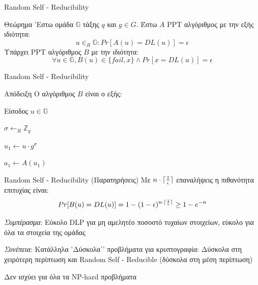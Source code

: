 \documentclass[handout]{beamer}
\DeclarePairedDelimiter{\ceil}{\lceil}{\rceil}
\begin{document}
 

\begin{frame}{Random Self - Reducibility}
	\begin{block}{Θεώρημα}
		'Εστω ομάδα $\mathbb{G}$ τάξης $q$ και $g \in G$. Έστω $A$ PPT αλγόριθμος με την εξής ιδιότητα:
		$$u \in_R \mathbb{G} : Pr[A(u)=DL(u)] = \epsilon$$
		Υπάρχει PPT αλγόριθμος $B$ με την ιδιότητα:
		$$\forall u \in \mathbb{G}, B(u) \in \{fail,x\} \land Pr[x=DL(u)] = \epsilon$$
	\end{block}
\end{frame}

\begin{frame}{Random Self - Reducibility}
	\begin{block}{Απόδειξη}
		Ο αλγόριθμος $B$ είναι ο εξής:
		\begin{algorithm}[H]
		{Είσοδος $u \in \mathbb{G}$} \; 

		{$\sigma \leftarrow_R \mathbb{Z}_q$} \; 

		{$u_1 \leftarrow u \cdot g^\sigma$} \; 

		{$a_1 \leftarrow  A(u_1)$}\; 

		 \;
		\end{algorithm}
	\end{block}
\end{frame}

\begin{frame}{Random Self - Reducibility (Παρατηρήσεις)}
	Με $n \cdot \ceil{\frac{1}{\epsilon}}$ επαναλήψεις η πιθανότητα επιτυχίας είναι:
	$$Pr[B(u)=DL(u)] = 1 - (1-\epsilon)^{n \cdot \ceil{\frac{1}{\epsilon}}} \geq  1-e^{-n}$$

	\emph{Συμπέρασμα}: Εύκολο DLP για μη αμελητέο ποσοστό τυχαίων στοιχείων, εύκολο για όλα τα στοιχεία της ομάδας

	\emph{Συνέπεια}: Κατάλληλα 'Δύσκολα΄' προβλήματα για κρυπτογραφία: Δύσκολα στη χειρότερη περίπτωση και Random Self - Reducible (δύσκολα στη μέση περίπτωση) 
	
	\alert{Δεν ισχύει για όλα τα NP-hard προβλήματα} 

\end{frame}
\end{document}
